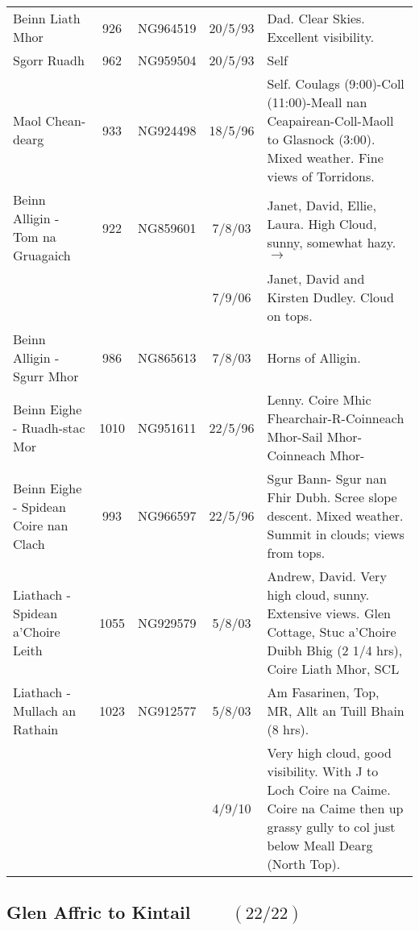 \documentclass[10pt,a4paper]{article}
\begin{document}
\begin{tabular}{p{3.5cm}cccp{6cm}}
Beinn Liath Mhor & 926  & NG964519 &20/5/93&Dad. Clear Skies. Excellent visibility.\\
Sgorr Ruadh & 962 & NG959504 &20/5/93&Self\\
Maol Chean-dearg & 933 & NG924498  &18/5/96& Self. Coulags (9:00)-Coll (11:00)-Meall nan
Ceapairean-Coll-Maoll to Glasnock (3:00). Mixed weather. Fine views of Torridons.  \\
Beinn Alligin - Tom na Gruagaich  & 922 & NG859601&7/8/03&Janet, David, Ellie, Laura.
High Cloud, sunny, somewhat hazy.$\rightarrow$ \\
&&&7/9/06&Janet, David and Kirsten Dudley. Cloud on tops.\\
Beinn Alligin - Sgurr Mhor & 986 & NG865613&7/8/03& Horns of Alligin. \\
Beinn Eighe - Ruadh-stac Mor & 1010 & NG951611 &22/5/96&Lenny.
Coire Mhic Fhearchair-R-Coinneach
Mhor-Sail Mhor-Coinneach Mhor- \\
Beinn Eighe - Spidean Coire nan Clach & 993  & NG966597&22/5/96&Sgur Bann- Sgur nan Fhir Dubh.
Scree slope descent. Mixed weather. Summit in clouds; views from tops.\\
Liathach - Spidean a'Choire Leith  & 1055  & NG929579
&5/8/03&Andrew, David. Very high cloud, sunny. Extensive views.
Glen Cottage, Stuc a'Choire Duibh Bhig (2 1/4 hrs),
Coire Liath Mhor, SCL \\
Liathach - Mullach an Rathain & 1023  & NG912577 &5/8/03&Am Fasarinen, Top, MR, Allt an Tuill Bhain
(8 hrs).\\
&&&4/9/10&Very high cloud, good visibility. With J to Loch Coire na Caime. Coire na Caime then up grassy gully to
col just below Meall Dearg (North Top).
\end{tabular}

\newpage

\subsection*{Glen Affric to Kintail $\qquad (22/22)$}
\end{document}
